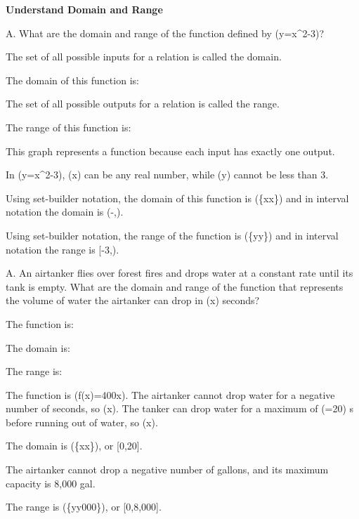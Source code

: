 \documentclass{article}
\newenvironment{example}[1]{}{}         %
\newcommand{\answer}[1]{}               %
\newcommand{\placeholder}[2]{}          %
\newcommand{\te}[1]{}                   %
\begin{document}
\begin{example}{1}
\textbf{Understand Domain and Range}

A. What are the domain and range of the function defined by (y=x^2-3)?

The set of all possible inputs for a relation is called the domain.

The domain of this function is:

The set of all possible outputs for a relation is called the range.

The range of this function is:


This graph represents a function because each input has exactly one output.

In (y=x^2-3), (x) can be any real number, while (y) cannot be less than 3.
\te{The TE graph callout prints ``less than 3''; the graph and worked range show that the lower bound is -3.}

Using set-builder notation, the domain of this function is (\{x\mid x\}) and in interval notation the domain is (-\infty,\infty).

Using set-builder notation, the range of the function is (\{y\mid y\}) and in interval notation the range is [-3,\infty).

A. An airtanker flies over forest fires and drops water at a constant rate until its tank is empty. What are the domain and range of the function that represents the volume of water the airtanker can drop in (x) seconds?
\te{The packet labels this part A again; the TE labels it B.}

\placeholder{photo}{Airtanker dropping water over a forest fire, with labels ``Rate: 400 gals per second'' and ``8,000 gals. in the tank.''}

The function is:

The domain is:

The range is:

The function is (f(x)=400x). The airtanker cannot drop water for a negative number of seconds, so (x). The tanker can drop water for a maximum of (=20) s before running out of water, so (x).

The domain is (\{x\leq x\}), or [0,20].

The airtanker cannot drop a negative number of gallons, and its maximum capacity is 8,000 gal.

The range is (\{y\leq y000\}), or [0,8{,}000].
\answer{A. Domain: (\{x\mid x\text{ is a real number}\}); (-\infty,\infty). Range: (\{y\mid y\geq-3\}); [-3,\infty). B. (f(x)=400x); domain: (\{x\mid0\leq x\leq20\}), [0,20]; range: (\{y\mid0\leq y\leq8{,}000\}), [0,8{,}000].}
\end{example}
\end{document}

